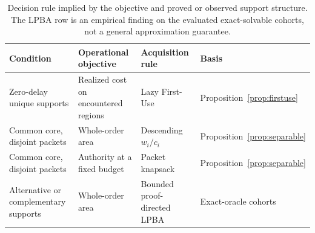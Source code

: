 \begin{table}[H]
\caption{Decision rule implied by the objective and proved or observed support structure. The LPBA row is an empirical finding on the evaluated exact-solvable cohorts, not a general approximation guarantee.\label{tab:regimes}}
\centering\small\renewcommand{\arraystretch}{1.08}
\begin{tabular}{>{\raggedright\arraybackslash}p{3.1cm}>{\raggedright\arraybackslash}p{3.0cm}>{\raggedright\arraybackslash}p{3.0cm}>{\raggedright\arraybackslash}p{2.9cm}}
\toprule
Condition & Operational objective & Acquisition rule & Basis \\
\midrule
Zero-delay unique supports & Realized cost on encountered regions & Lazy First-Use & Proposition~\ref{prop:firstuse} \\
Common core, disjoint packets & Whole-order area & Descending $w_i/c_i$ & Proposition~\ref{prop:separable} \\
Common core, disjoint packets & Authority at a fixed budget & Packet knapsack & Proposition~\ref{prop:separable} \\
Alternative or complementary supports & Whole-order area & Bounded proof-directed LPBA & Exact-oracle cohorts \\
\bottomrule
\end{tabular}
\end{table}
